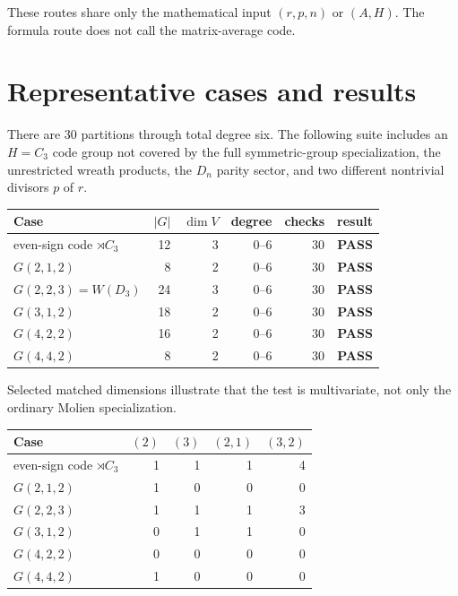 \documentclass[11pt]{article}
\newcommand{\PASS}{\textcolor{passgreen}{\textbf{PASS}}}
\begin{document}
These routes share only the mathematical input $(r,p,n)$ or $(A,H)$.  The
formula route does not call the matrix-average code.

\section{Representative cases and results}

There are 30 partitions through total degree six.  The following suite includes
an $H=C_3$ code group not covered by the full symmetric-group specialization,
the unrestricted wreath products, the $D_n$ parity sector, and two different
nontrivial divisors $p$ of $r$.

\begin{center}
\begin{tabularx}{\linewidth}{@{}Xrrrrc@{}}
\toprule
Case & $|G|$ & $\dim V$ & degree & checks & result\\
\midrule
even-sign code $\rtimes C_3$ & 12 & 3 & $0$--$6$ & 30 & \PASS\\
$G(2,1,2)$ & 8 & 2 & $0$--$6$ & 30 & \PASS\\
$G(2,2,3)=W(D_3)$ & 24 & 3 & $0$--$6$ & 30 & \PASS\\
$G(3,1,2)$ & 18 & 2 & $0$--$6$ & 30 & \PASS\\
$G(4,2,2)$ & 16 & 2 & $0$--$6$ & 30 & \PASS\\
$G(4,4,2)$ & 8 & 2 & $0$--$6$ & 30 & \PASS\\
\bottomrule
\end{tabularx}
\end{center}

Selected matched dimensions illustrate that the test is multivariate, not only
the ordinary Molien specialization.
\begin{center}
\begin{tabular}{@{}lrrrr@{}}
\toprule
Case & $(2)$ & $(3)$ & $(2,1)$ & $(3,2)$\\
\midrule
even-sign code $\rtimes C_3$ & 1 & 1 & 1 & 4\\
$G(2,1,2)$ & 1 & 0 & 0 & 0\\
$G(2,2,3)$ & 1 & 1 & 1 & 3\\
$G(3,1,2)$ & 0 & 1 & 1 & 0\\
$G(4,2,2)$ & 0 & 0 & 0 & 0\\
$G(4,4,2)$ & 1 & 0 & 0 & 0\\
\bottomrule
\end{tabular}
\end{center}
\end{document}
